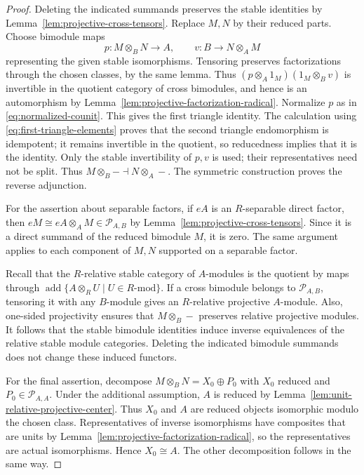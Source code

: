 \documentclass[12pt,a4paper,english,reqno]{amsart}
\numberwithin{equation}{section}
\theoremstyle{plain}
\theoremstyle{definition}
\begin{document}
\begin{proof}
Deleting the indicated summands preserves the stable identities by
Lemma~\ref{lem:projective-cross-tensors}.  Replace $M,N$ by their
reduced parts.  Choose bimodule maps
\[
 p:M\otimes_BN\longrightarrow A,
 \qquad v:B\longrightarrow N\otimes_AM
\]
representing the given stable isomorphisms.  Tensoring preserves
factorizations through the chosen classes, by the same lemma.
Thus $(p\otimes_A1_M)(1_M\otimes_Bv)$ is invertible in the quotient
category of cross bimodules, and hence is an automorphism by
Lemma~\ref{lem:projective-factorization-radical}.  Normalize $p$ as
in \eqref{eq:normalized-counit}.  This gives the first triangle identity.
The calculation using
\eqref{eq:first-triangle-elements} proves that the second triangle
endomorphism is idempotent; it remains invertible in the quotient,
so reducedness implies that it is the identity.  Only the stable
invertibility of $p,v$ is used; their representatives need not be split.
Thus $M\otimes_B-\dashv N\otimes_A-$.
The symmetric construction proves the reverse adjunction.

For the assertion about separable factors, if $eA$ is an
$R$-separable direct factor, then
$eM\cong eA\otimes_AM\in\mathcal P_{A,B}$ by
Lemma~\ref{lem:projective-cross-tensors}.  Since it is a direct
summand of the reduced bimodule $M$, it is zero.  The same argument
applies to each component of $M,N$ supported on a separable factor.

Recall that the $R$-relative stable category of $A$-modules is the quotient
by maps through $\operatorname{add}\{A\otimes_RU\mid
U\in R\text{-}\mathrm{mod}\}$.  If a cross bimodule belongs to
$\mathcal P_{A,B}$, tensoring it with any $B$-module gives an
$R$-relative projective $A$-module.  Also, one-sided projectivity
ensures that $M\otimes_B-$ preserves relative projective modules.
It follows that the stable bimodule identities induce inverse
equivalences of the relative stable module categories.  Deleting the
indicated bimodule summands does not change these induced functors.

For the final assertion, decompose $M\otimes_BN=X_0\oplus P_0$
with $X_0$ reduced and $P_0\in\mathcal P_{A,A}$.
Under the additional assumption, $A$ is reduced by
Lemma~\ref{lem:unit-relative-projective-center}.  Thus $X_0$ and $A$ are reduced
objects isomorphic modulo the chosen class.  Representatives of
inverse isomorphisms have composites that are units by
Lemma~\ref{lem:projective-factorization-radical}, so the
representatives are actual isomorphisms.  Hence $X_0\cong A$.
The other decomposition follows in the same way.
\end{proof}
\end{document}
